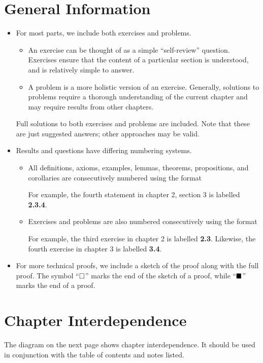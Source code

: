\section*{General Information}
\begin{itemize}
    \item For most parts, we include both exercises and problems.
    \begin{itemize}
        \item An exercise can be thought of as a simple ``self-review'' question. Exercises ensure that the content of a particular section is understood, and is relatively simple to answer.
        \item A problem is a more holistic version of an exercise. Generally, solutions to problems require a thorough understanding of the current chapter and may require results from other chapters.        
    \end{itemize}
    Full solutions to both exercises and problems are included. Note that these are just suggested answers; other approaches may be valid.

    \item Results and questions have differing numbering systems.
    \begin{itemize}
        \item All definitions, axioms, examples, lemmas, theorems, propositions, and corollaries are consecutively numbered using the format
        \begin{quote}
        \end{quote}
        For example, the fourth statement in chapter 2, section 3 is labelled \textbf{2.3.4}.
        \item Exercises and problems are also numbered consecutively using the format
        \begin{quote}
        \end{quote}
        For example, the third exercise in chapter 2 is labelled \textbf{2.3}. Likewise, the fourth exercise in chapter 3 is labelled \textbf{3.4}.
    \end{itemize}
    \item For more technical proofs, we include a sketch of the proof along with the full proof. The symbol ``$\square$'' marks the end of the sketch of a proof, while ``$\blacksquare$'' marks the end of a proof.
\end{itemize}

\section*{Chapter Interdependence}
The diagram on the next page shows chapter interdependence. It should be used in conjunction with the table of contents and notes listed.

